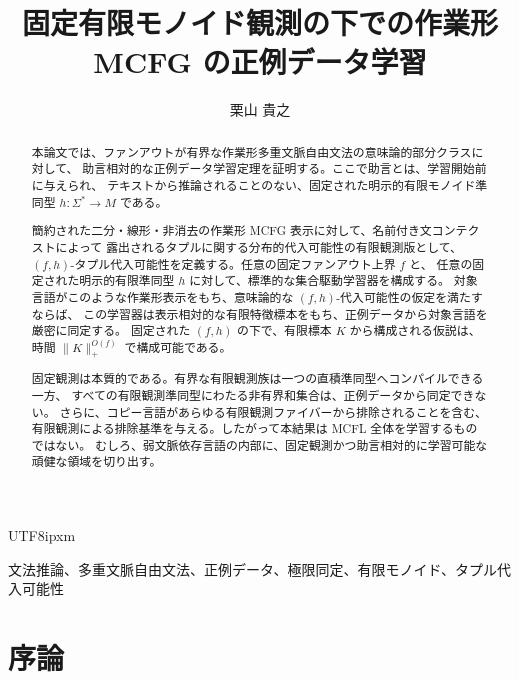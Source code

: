 \documentclass[10pt,a4paper]{article}
\title{\vspace{-1.5cm}固定有限モノイド観測の下での作業形 MCFG の正例データ学習}
\author{栗山 貴之}
\date{\vspace{-5ex}}
\theoremstyle{remark}
\newcommand{\keywords}[1]{\smallskip\noindent{\bfseries キーワード:} #1}
\begin{document}
\begin{CJK}{UTF8}{ipxm}

\setlength{\abovedisplayskip}{3pt}
\setlength{\belowdisplayskip}{3pt}
\setlength{\abovedisplayshortskip}{0pt}
\setlength{\belowdisplayshortskip}{0pt}

\maketitle
\vspace{-1em}

\begin{abstract}
本論文では、ファンアウトが有界な作業形多重文脈自由文法の意味論的部分クラスに対して、
助言相対的な正例データ学習定理を証明する。ここで助言とは、学習開始前に与えられ、
テキストから推論されることのない、固定された明示的有限モノイド準同型
\(h:\Sigma^*\to M\) である。

簡約された二分・線形・非消去の作業形 MCFG 表示に対して、名前付き文コンテクストによって
露出されるタプルに関する分布的代入可能性の有限観測版として、
\((f,h)\)-タプル代入可能性を定義する。任意の固定ファンアウト上界 \(f\) と、
任意の固定された明示的有限準同型 \(h\) に対して、標準的な集合駆動学習器を構成する。
対象言語がこのような作業形表示をもち、意味論的な \((f,h)\)-代入可能性の仮定を満たすならば、
この学習器は表示相対的な有限特徴標本をもち、正例データから対象言語を厳密に同定する。
固定された \((f,h)\) の下で、有限標本 \(K\) から構成される仮説は、
時間 \(\|K\|_+^{O(f)}\) で構成可能である。

固定観測は本質的である。有界な有限観測族は一つの直積準同型へコンパイルできる一方、
すべての有限観測準同型にわたる非有界和集合は、正例データから同定できない。
さらに、コピー言語があらゆる有限観測ファイバーから排除されることを含む、
有限観測による排除基準を与える。したがって本結果は MCFL 全体を学習するものではない。
むしろ、弱文脈依存言語の内部に、固定観測かつ助言相対的に学習可能な頑健な領域を切り出す。
\end{abstract}

\keywords{文法推論、多重文脈自由文法、正例データ、極限同定、有限モノイド、タプル代入可能性}

\section{序論}
\label{sec:introduction}


\end{CJK}
\end{document}
